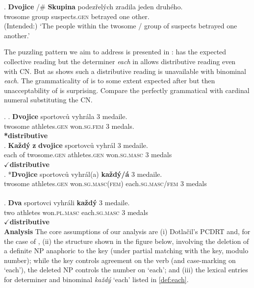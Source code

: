 \documentclass[12pt, a4paper]{scrartcl}
\begin{document}
\exg. \textbf{Dvojice} /\#\hspace{-2pt} \textbf{Skupina} podezřelých zradila jeden druhého.\\
twosome {} group suspects.\textsc{gen} betrayed one other.\\
(Intended:) `The people within the twosome / group of suspects betrayed one another.'\vspace{-4pt}

The puzzling pattern we aim to address is presented in \Next: \Next[a] has the expected collective reading but the determiner \textit{each} in \Next[b] allows distributive reading even with CN. But as \Next[c] shows such a distributive reading is unavailable with binominal \textit{each}. The grammaticality of \Next[b] is to some extent expected after \Last but then unacceptability of \Next[c] is surprising. Compare the perfectly grammatical \Next[d] with cardinal numeral substituting the CN.\vspace{-4pt}

\ex. \ag. \textbf{Dvojice} sportovců vyhrála 3 medaile.\label{ex:dvojice-cum}\\
twosome athletes.\textsc{gen} won.\textsc{sg.fem} 3 medals.\\\hfill \textbf{*distributive}\\\vspace{-4pt}
\bg. \textbf{Každý} \textbf{z} \textbf{dvojice} sportovců vyhrál 3 medaile.\label{ex:dvojice-det-each}\\
each of twosome.\textsc{gen} athletes.\textsc{gen} won.\textsc{sg.masc} 3 medals\\\hfill $\checkmark$\textbf{distributive}\\\vspace{-4pt}
\bg. *\textbf{Dvojice} sportovců vyhrál(a) \textbf{každý/á} 3 medaile.\label{ex:dvojice-bin-each}\\
twosome athletes.\textsc{gen} won.\textsc{sg.masc(fem)} each.\textsc{sg.masc/fem} 3 medals\\ \\\vspace{-4pt}
\bg. \textbf{Dva} sportovci vyhráli \textbf{každý} 3 medaile.\label{ex:dva-bin-each}\\
two athletes won.\textsc{pl.masc} each.\textsc{sg.masc} 3 medals\\\hfill$\checkmark$\textbf{distributive}\\

\vspace{-8pt}\textbf{Analysis} The core assumptions of our analysis are (i) Dotlačil's PCDRT and, for the case of \Last[d], (ii) the structure shown in the figure below, involving the deletion of a definite NP anaphoric to the key (under partial matching with the key, modulo number); while the key controls agreement on the verb (and case-marking on `each'), the deleted NP controls the number on `each'; and (iii) the lexical entries for determiner and binominal \textit{každý} `each' listed in \ref{def:each}.\vspace{-4pt}
\end{document}
